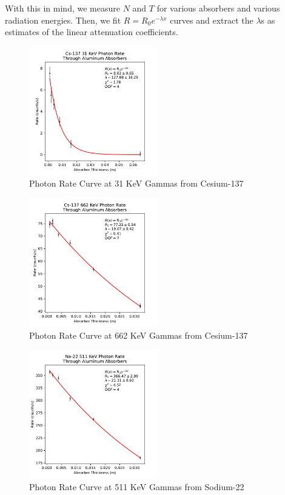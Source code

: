 \documentclass[12pt, letterpaper]{article}
\begin{document}
With this in mind, we measure $N$ and $T$ for various absorbers and various radiation energies. Then, we fit $R = R_0 e^{-\lambda x}$ curves and extract the $\lambda$s as estimates of the linear attenuation coefficients. 

\begin{figure}[!htb]
    \centering
    \includegraphics[width=0.5\textwidth]{experiment1/figures/cs137/rates-31.pdf}
    \caption{Photon Rate Curve at 31 KeV Gammas from Cesium-137}
    \label{fig:rates31}
\end{figure}

\begin{figure}[!htb]
    \centering
    \includegraphics[width=0.5\textwidth]{experiment1/figures/cs137/rates-662.pdf}
    \caption{Photon Rate Curve at 662 KeV Gammas from Cesium-137}
    \label{fig:rates662}
\end{figure}

\begin{figure}[!htb]
    \centering
    \includegraphics[width=0.5\textwidth]{experiment1/figures/na22/rates-511.pdf}
    \caption{Photon Rate Curve at 511 KeV Gammas from Sodium-22}
    \label{fig:rates511}
\end{figure}
\end{document}
